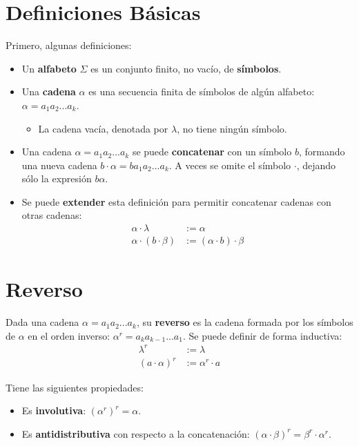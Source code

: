 \section{Definiciones Básicas}

Primero, algunas definiciones:

\begin{itemize}
    \item Un \textbf{alfabeto} $\Sigma$ es un conjunto finito, no vacío, de \textbf{símbolos}.
    \item Una \textbf{cadena} $\alpha$ es una secuencia finita de símbolos de algún alfabeto: $\alpha = a_1 a_2 ... a_k$.
    \begin{itemize}
        \item La cadena vacía, denotada por $\lambda$, no tiene ningún símbolo.
    \end{itemize}
    \item Una cadena $\alpha = a_1 a_2 ... a_k$ se puede \textbf{concatenar} con un símbolo $b$, formando una nueva cadena $b \cdot \alpha = b a_1 a_2 ... a_k$. A veces se omite el símbolo $\cdot$, dejando sólo la expresión $b \alpha$.
    \item Se puede \textbf{extender} esta definición para permitir concatenar cadenas con otras cadenas:
    $$
    \begin{aligned}
        \alpha \cdot \lambda & := \alpha \\
        \alpha \cdot (b \cdot \beta) & := (\alpha \cdot b) \cdot \beta
    \end{aligned}
    $$
\end{itemize}

\section{Reverso}

Dada una cadena $\alpha = a_1 a_2 ... a_k$, su \textbf{reverso} es la cadena formada por los símbolos de $\alpha$ en el orden inverso: $\alpha^r = a_k a_{k-1} ... a_1$. Se puede definir de forma inductiva:
$$
\begin{aligned}
    \lambda^r & := \lambda \\
    (a \cdot \alpha)^r & := \alpha^r \cdot a
\end{aligned}
$$

Tiene las siguientes propiedades:
\begin{itemize}
    \item Es \textbf{involutiva}: $(\alpha^r)^r = \alpha$.
    \item Es \textbf{antidistributiva} con respecto a la concatenación: $(\alpha \cdot \beta)^r = \beta^r \cdot \alpha^r$.
\end{itemize}

